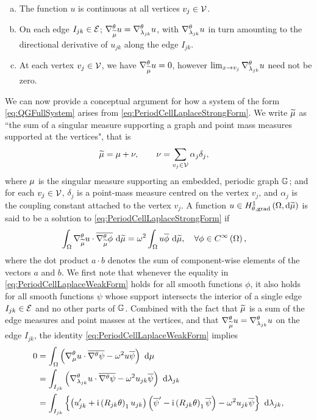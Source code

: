\begin{enumerate}[(a)]
	\item The function $u$ is continuous at all vertices $v_j\in\mathcal{V}$.
	\item On each edge $I_{jk}\in\mathcal{E}$; $\nabla^{\theta}_{\widetilde{\mu}}u = \nabla^{\theta}_{\lambda_{jk}}u$, with $\nabla^{\theta}_{\lambda_{jk}}u$ in turn amounting to the directional derivative of $u_{jk}$ along the edge $I_{jk}$.
	\item At each vertex $v_j\in\mathcal{V}$, we have $\nabla^{\theta}_{\widetilde{\mu}}u=0$, however $\lim_{x\rightarrow v_j}\nabla^{\theta}_{\lambda_{jk}}u$ need not be zero.
\end{enumerate}

We can now provide a conceptual argument for how a system of the form \eqref{eq:QGFullSystem} arises from \eqref{eq:PeriodCellLaplaceStrongForm}.
We write $\widetilde{\mu}$ as ``the sum of a singular measure supporting a graph and point mass measures supported at the vertices", that is
\begin{align*}
	\widetilde{\mu} &= \mu + \nu, \qquad
	\nu = \sum_{v_j\in\mathcal{V}}\alpha_j \delta_j,
\end{align*}
where $\mu$ is the singular measure supporting an embedded, periodic graph $\mathbb{G}$; and for each $v_j\in\mathcal{V}$, $\delta_j$ is a point-mass measure centred on the vertex $v_j$, and $\alpha_j$ is the coupling constant attached to the vertex $v_j$.
A function $u\in H^1_{\theta, \mathrm{grad}}\left( \Omega, \mathrm{d}\widetilde{\mu} \right)$ is said to be a solution to \eqref{eq:PeriodCellLaplaceStrongForm} if
\begin{align} \label{eq:PeriodCellLaplaceWeakForm}
	\int_{\Omega}\nabla^{\theta}_{\widetilde{\mu}}u\cdot\overline{\nabla^{\theta}_{\widetilde{\mu}}\phi} \ \mathrm{d}\widetilde{\mu} &= \omega^2\int_{\Omega}u\overline{\phi} \ \mathrm{d}\widetilde{\mu}, \quad\forall \phi\in C^{\infty}\left( \Omega \right),
\end{align}
where the dot product $a\cdot b$ denotes the sum of component-wise elements of the vectors $a$ and $b$.
We first note that whenever the equality in \eqref{eq:PeriodCellLaplaceWeakForm} holds for all smooth functions $\phi$, it also holds for all smooth functions $\psi$ whose support intersects the interior of a single edge $I_{jk}\in\mathcal{E}$ and no other parts of $\mathbb{G}$.
Combined with the fact that $\widetilde{\mu}$ is a sum of the edge measures and point masses at the vertices, and that $\nabla^{\theta}_{\widetilde{\mu}}u=\nabla^{\theta}_{\lambda_{jk}}u$ on the edge $I_{jk}$, the identity \eqref{eq:PeriodCellLaplaceWeakForm} implies
\begin{align*}
	0 &= \int_{\Omega} \left( \nabla^{\theta}_\mu u \cdot \overline{\nabla^{\theta}\psi} - \omega^2 u\overline{\psi} \right)  \ \mathrm{d}\mu \\
	&= \int_{I_{jk}} \left( \nabla^{\theta}_{\lambda_{jk}}u \cdot \overline{\nabla^{\theta}\psi} - \omega^2 u_{jk}\overline{\psi} \right)  \ \mathrm{d}\lambda_{jk} \\
	&= \int_{I_{jk}} \left\{  \left( u_{jk}' + \mathrm{i}\left( R_{jk}\theta \right)_1 u_{jk} \right)\left( \overline{\psi}' - \mathrm{i}\left( R_{jk}\theta \right)_1 \overline{\psi}  \right) - \omega^2 u_{jk}\overline{\psi}  \right\}  \ \mathrm{d}\lambda_{jk},
\end{align*}
